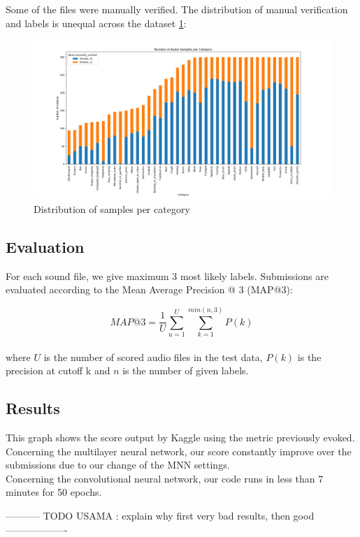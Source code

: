 \documentclass{article} %
\begin{document}
		Some of the files were manually verified. The distribution of manual verification and labels is unequal across the dataset \ref{fig:category_distribution}:
		\begin{figure}[H]
		  \includegraphics[width=\linewidth]{../midterm/category_distribution.png}
		  \caption{Distribution of samples per category}
		  \label{fig:category_distribution}
		\end{figure}


	\subsection{Evaluation}
		For each sound file, we give maximum 3 most likely labels.
		Submissions are evaluated according to the Mean Average Precision @ 3 (MAP@3):

		$$MAP@3 = \frac{1}{U} \displaystyle\sum_{u=1}^U \displaystyle\sum_{k=1}^{min(n,3)}P(k)$$\\

		where $U$ is the number of scored audio files in the test data, $P(k)$ is the precision at cutoff k and $n$ is the number of given labels.

	\subsection{Results}

		This graph shows the score output by Kaggle using the metric previously evoked.\\
		Concerning the multilayer neural network, our score constantly improve over the submissions due to our change of the MNN settings.\\
		Concerning the convolutional neural network, our code runs in less than 7 minutes for 50 epochs.

		----------- TODO USAMA : explain why first very bad results, then good -------------------
\end{document}
